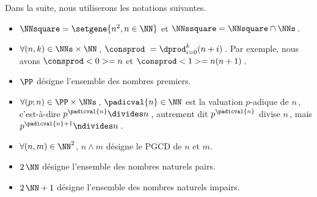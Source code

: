 Dans la suite, nous utiliserons les notations suivantes.
%
\begin{itemize}
	\item $\NNsquare = \setgene{n^2, n \in \NN}$
	      et
	      $\NNssquare = \NNsquare \cap \NNs$\,.

	\item $\forall (n, k) \in \NNs \times \NN$\,, $\consprod\ = \dprod_{i = 0}^{k} (n + i)$\,. 
	Par exemple, nous avons $\consprod<0> = n$ et $\consprod<1> = n(n+1)$\,.

	\item $\PP$ désigne l'ensemble des nombres premiers.
	
	\item $\forall (p ; n) \in \PP \times \NNs$\,, $\padicval{n} \in \NN$ est la valuation $p$-adique de $n$\,, c'est-à-dire $p^{\padicval{n}} \divides n$\,, autrement dit $p^{\padicval{n}}$ divise $n$\,, mais $p^{\padicval{n} + 1} \ndivides n$\,.

	\item $\forall (n , m) \in \NN^2$, $n \wedge m$ désigne le PGCD de $n$ et $m$.
	
	\item $2\,\NN$ désigne l'ensemble des nombres naturels pairs.
	
	\item $2\,\NN + 1$ désigne l'ensemble des nombres naturels impairs.
\end{itemize}